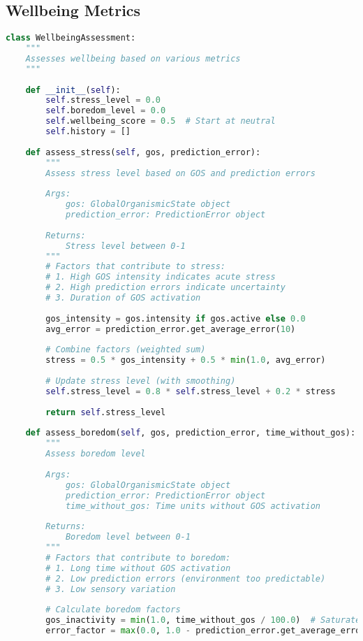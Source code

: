 \documentclass[11pt,a4paper]{article}
\begin{document}
\subsection{Wellbeing Metrics}

\begin{lstlisting}[language=Python]
class WellbeingAssessment:
    """
    Assesses wellbeing based on various metrics
    """
    
    def __init__(self):
        self.stress_level = 0.0
        self.boredom_level = 0.0
        self.wellbeing_score = 0.5  # Start at neutral
        self.history = []
        
    def assess_stress(self, gos, prediction_error):
        """
        Assess stress level based on GOS and prediction errors
        
        Args:
            gos: GlobalOrganismicState object
            prediction_error: PredictionError object
            
        Returns:
            Stress level between 0-1
        """
        # Factors that contribute to stress:
        # 1. High GOS intensity indicates acute stress
        # 2. High prediction errors indicate uncertainty
        # 3. Duration of GOS activation
        
        gos_intensity = gos.intensity if gos.active else 0.0
        avg_error = prediction_error.get_average_error(10)
        
        # Combine factors (weighted sum)
        stress = 0.5 * gos_intensity + 0.5 * min(1.0, avg_error)
        
        # Update stress level (with smoothing)
        self.stress_level = 0.8 * self.stress_level + 0.2 * stress
        
        return self.stress_level
        
    def assess_boredom(self, gos, prediction_error, time_without_gos):
        """
        Assess boredom level
        
        Args:
            gos: GlobalOrganismicState object
            prediction_error: PredictionError object
            time_without_gos: Time units without GOS activation
            
        Returns:
            Boredom level between 0-1
        """
        # Factors that contribute to boredom:
        # 1. Long time without GOS activation
        # 2. Low prediction errors (environment too predictable)
        # 3. Low sensory variation
        
        # Calculate boredom factors
        gos_inactivity = min(1.0, time_without_gos / 100.0)  # Saturate at 100 time units
        error_factor = max(0.0, 1.0 - prediction_error.get_average_error(20))
        

\end{lstlisting}
\end{document}
